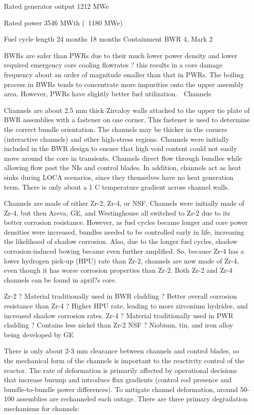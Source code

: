\documentclass[10pt]{article}
\begin{document}
Rated generator output
1212 MWe

Rated power
3546 MWth (~1180 MWe)

Fuel cycle length
24 months
18 months
Containment
BWR 4, Mark 2


BWRs are safer than PWRs due to their much lower power density and lower required emergency core cooling flowrates ? this results in a core damage frequency about an order of magnitude smaller than that in PWRs. The boiling process in BWRs tends to concentrate more impurities onto the upper assembly area. However, PWRs have slightly better fuel utilization. 
Channels

Channels are about 2.5 mm thick Zircaloy walls attached to the upper tie plate of BWR assemblies with a fastener on one corner. This fastener is used to determine the correct bundle orientation. The channels may be thicker in the corners (interactive channels) and other high-stress regions. Channels were initially included in the BWR design to ensure that high void content could not easily move around the core in transients. Channels direct flow through bundles while allowing flow past the NIs and control blades. In addition, channels act as heat sinks during LOCA scenarios, since they themselves have no heat generation term. There is only about a 1 C temperature gradient across channel walls. 

Channels are made of either Zr-2, Zr-4, or NSF. Channels were initially made of Zr-4, but then Areva, GE, and Westinghouse all switched to Zr-2 due to its better corrosion resistance. However, as fuel cycles became longer and core power densities were increased, bundles needed to be controlled early in life, increasing the likelihood of shadow corrosion. Also, due to the longer fuel cycles, shadow corrosion-induced bowing became even further amplified. So, because Zr-4 has a lower hydrogen pick-up (HPU) rate than Zr-2, channels are now made of Zr-4, even though it has worse corrosion properties than Zr-2. Both Zr-2 and Zr-4 channels can be found in april?s core.  

Zr-2
?	Material traditionally used in BWR cladding
?	Better overall corrosion resistance than Zr-4
?	Higher HPU rate, leading to more zirconium hydrides, and increased shadow corrosion rates.
Zr-4
?	Material traditionally used in PWR cladding
?	Contains less nickel than Zr-2
NSF
?	Niobium, tin, and iron alloy being developed by GE

There is only about 2-3 mm clearance between channels and control blades, so the mechanical form of the channels is important to the reactivity control of the reactor. The rate of deformation is primarily affected by operational decisions that increase burnup and introduce flux gradients (control rod presence and bundle-to-bundle power differences). To mitigate channel deformation, around 50-100 assemblies are rechanneled each outage. There are three primary degradation mechanisms for channels:
\end{document}
